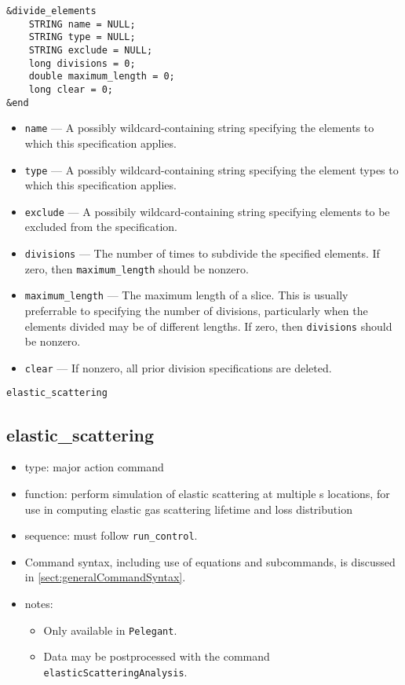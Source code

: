 \documentclass[11pt]{article}
\begin{document}
\begin{verbatim}
&divide_elements
    STRING name = NULL;
    STRING type = NULL;
    STRING exclude = NULL;
    long divisions = 0;
    double maximum_length = 0;
    long clear = 0;
&end
\end{verbatim}

\begin{itemize}
\item \verb|name| --- A possibly wildcard-containing string specifying
	the elements to which this specification applies.
\item \verb|type| --- A possibly wildcard-containing string specifying
 	the element types to which this specification applies.
\item \verb|exclude| --- A possibily wildcard-containing string specifying
 	elements to be excluded from the specification.
\item \verb|divisions| --- The number of times to subdivide the specified
	elements.  If zero, then \verb|maximum_length| should be nonzero.
\item \verb|maximum_length| --- The maximum length of a slice.  This is
	usually preferrable to specifying the number of divisions, particularly
	when the elements divided may be of different lengths.  If zero, then
	\verb|divisions| should be nonzero.
\item \verb|clear| --- If nonzero, all prior division specifications are
	deleted.
\end{itemize}

\newpage
\begin{center}{\Large\verb|elastic_scattering|}\end{center}
\subsection{elastic\_scattering \label{subsec:elasticscattering}}

\begin{itemize}
\item type: major action command
\item function: perform simulation of elastic scattering at multiple s locations, for
  use in computing elastic gas scattering lifetime and loss distribution
\item sequence: must follow \verb|run_control|.
\item Command syntax, including use of equations and subcommands, is discussed in \ref{sect:generalCommandSyntax}.
\item notes: 
  \begin{itemize} 
    \item Only available in \verb|Pelegant|.
    \item Data may be postprocessed with the command \verb|elasticScatteringAnalysis|.
    \end{itemize}
\end{itemize}
\end{document}
